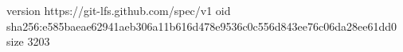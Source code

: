 version https://git-lfs.github.com/spec/v1
oid sha256:e585baeae62941aeb306a11b616d478e9536c0c556d843ee76c06da28ee61dd0
size 3203
